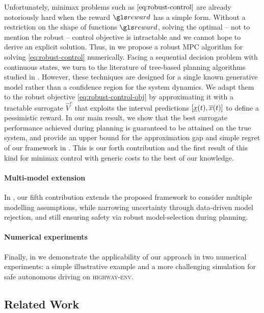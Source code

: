 Unfortunately, minimax problems such as $\eqref{eq:robust-control}$ are already notoriously hard when the reward $\R$ has a simple form. Without a restriction on the shape of functions $\R$, solving the optimal -- not to mention the robust -- control objective is intractable and we cannot hope to derive an explicit solution. Thus, in \textbf{} we propose a robust \gls{MPC} algorithm for solving \eqref{eq:robust-control} numerically. Facing a sequential decision problem with continuous states, we turn to the literature of tree-based planning algorithms studied in .
However, these techniques are designed for a single known generative model rather than a confidence region for the system dynamics. We adapt them to the robust objective \eqref{eq:robust-control-obj} by approximating it with a tractable surrogate $\hat{V}^r$ that exploits the interval predictions $[\underline{x}(t), \overline{x}(t)]$ to define a pessimistic reward. In our main result, we show that the best surrogate performance achieved during planning is guaranteed to be attained on the true system, and provide an upper bound for the approximation gap and simple regret of our framework in . This is our forth contribution and the first result of this kind for minimax control with generic costs to the best of our knowledge. 

\paragraph{Multi-model extension}
In \textbf{}, our fifth contribution extends the proposed framework to consider multiple modelling assumptions, while narrowing uncertainty through data-driven model rejection, and still ensuring safety via robust model-selection during planning.

\paragraph{Numerical experiments}
Finally, in \textbf{} we demonstrate the applicability of our approach in two numerical experiments: a simple illustrative example and a more challenging simulation for safe autonomous driving on \textsc{highway-env}.

\subsection{Related Work}

